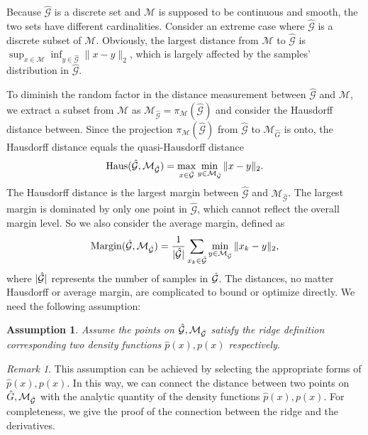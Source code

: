 \documentclass[aos,preprint]{imsart}
\newtheorem{assumption}[theorem]{Assumption}
\theoremstyle{remark}
\newtheorem*{remark}{Remark}
\begin{document}
Because $\hat{\mathcal G}$ is a discrete set and $\mathcal M$ is supposed to be continuous and smooth, the two sets have different cardinalities. Consider an extreme case where $\hat{\mathcal G}$ is a discrete subset of $\mathcal M$. Obviously, the largest distance from $\mathcal M$ to $\hat{\mathcal G}$ is $\sup_{x\in \mathcal M}\inf_{y\in\hat{\mathcal G}} \|x-y\|_2$, which is largely affected by the samples' distribution in $\hat{\mathcal G}$.

To diminish the random factor in the distance measurement between $\hat{\mathcal G}$ and $\mathcal M$, we extract a subset from $\mathcal M$ as ${\mathcal M}_{\hat{\mathcal G}}=\pi_{\mathcal M}(\hat{\mathcal G})$ and consider the Hausdorff distance between. Since the projection $\pi_{\mathcal M}(\hat{\mathcal G})$ from $\hat{\mathcal G}$ to $\mathcal M_{\hat{G}}$ is onto, the Hausdorff distance equals the quasi-Hausdorff distance
\begin{equation}\label{Hausd}
{\rm Haus}({\hat{\mathcal G}}, {\mathcal M}_{\hat{\mathcal G}}) = \max_{x\in \hat{\mathcal G}} \min_{y\in {\mathcal M}_{\hat{\mathcal G}}}\|x-y\|_2.
\end{equation}
The Hausdorff distance is the largest margin between $\hat{\mathcal G}$ and ${\mathcal M}_{\hat{\mathcal G}}$. The largest margin is dominated by only one point in $\hat{\mathcal G}$, which cannot reflect the overall margin level. So we also consider the average margin, defined as
\begin{equation}\label{margin}
{\rm Margin}({\hat{\mathcal G}, {\mathcal M}_{\hat{\mathcal G}}}) = \frac{1}{|\hat{\mathcal G}|} \sum_{x_k\in \hat{\mathcal G}} \min_{y\in {\mathcal M}_{\hat{\mathcal G}}}\|x_k-y\|_2,
\end{equation}
where $|\cal \hat{G}|$ represents the number of samples in $\cal \hat{G}$.
The distances, no matter Hausdorff or average margin, are complicated to bound or optimize directly. We need the following assumption:
\begin{assumption}\label{Data_assumption}
 Assume the points on $\hat{\cal G}, \cal M_{\hat{G}}$ satisfy the ridge definition corresponding two density functions $\hat{p}(x), p(x)$ respectively. 
\end{assumption}
\begin{remark}
This assumption can be achieved by selecting the appropriate forms of $\hat{p}(x), p(x)$. In this way, we can connect the distance between two points on $\hat G, \cal M_{\hat{G}}$ with the analytic quantity of the density functions $\hat{p}(x), p(x)$. For completeness, we give the proof of the connection between the ridge and the derivatives. 
\end{remark}
\end{document}
